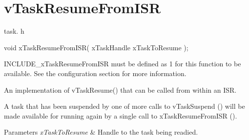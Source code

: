 \hypertarget{group__v_task_resume_from_i_s_r}{\section{v\-Task\-Resume\-From\-I\-S\-R}
\label{group__v_task_resume_from_i_s_r}
}
task. h 
\begin{DoxyPre}void xTaskResumeFromISR( xTaskHandle xTaskToResume );\end{DoxyPre}


I\-N\-C\-L\-U\-D\-E\-\_\-x\-Task\-Resume\-From\-I\-S\-R must be defined as 1 for this function to be available. See the configuration section for more information.

An implementation of v\-Task\-Resume() that can be called from within an I\-S\-R.

A task that has been suspended by one of more calls to v\-Task\-Suspend () will be made available for running again by a single call to x\-Task\-Resume\-From\-I\-S\-R ().


\begin{DoxyParams}{Parameters}
{\em x\-Task\-To\-Resume} & Handle to the task being readied. \\
\hline
\end{DoxyParams}
